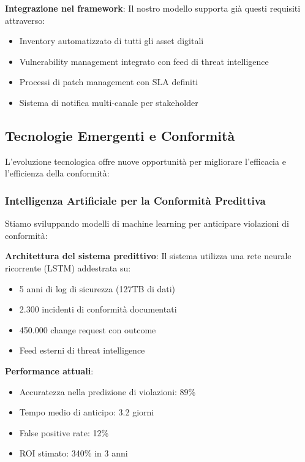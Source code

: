 \textbf{Integrazione nel framework}:
Il nostro modello supporta già questi requisiti attraverso:
\begin{itemize}
    \item Inventory automatizzato di tutti gli asset digitali
    \item Vulnerability management integrato con feed di threat intelligence
    \item Processi di patch management con SLA definiti
    \item Sistema di notifica multi-canale per stakeholder
\end{itemize}

\subsection{Tecnologie Emergenti e Conformità}
\label{subsec:4.9.2_tecnologie}

L'evoluzione tecnologica offre nuove opportunità per migliorare l'efficacia e l'efficienza della conformità:

\subsubsection{Intelligenza Artificiale per la Conformità Predittiva}

Stiamo sviluppando modelli di machine learning per anticipare violazioni di conformità:

\textbf{Architettura del sistema predittivo}:
Il sistema utilizza una rete neurale ricorrente (LSTM) addestrata su:
\begin{itemize}
    \item 5 anni di log di sicurezza (127TB di dati)
    \item 2.300 incidenti di conformità documentati
    \item 450.000 change request con outcome
    \item Feed esterni di threat intelligence
\end{itemize}

\textbf{Performance attuali}:
\begin{itemize}
    \item Accuratezza nella predizione di violazioni: 89\%
    \item Tempo medio di anticipo: 3.2 giorni
    \item False positive rate: 12\%
    \item ROI stimato: 340\% in 3 anni
\end{itemize}

